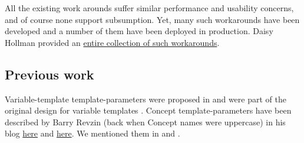 \documentclass{wg21}
\begin{document}
All the existing work arounds suffer similar performance and usability concerns, and of course none support subsumption.
Yet, many such workarounds have been developed and a number of them have been deployed in production.
Daisy Hollman provided an \href{https://p2841.godbolt.org/z/efYK1crb3}{entire collection of such workarounds}.

\pagebreak

%
%
%
%
%
%

\subsection{Previous work}

Variable-template template-parameters were proposed in  and were part of the original design for variable templates .
Concept template-parameters have been described by Barry Revzin (back when Concept names were uppercase) in his blog \href{https://brevzin.github.io/c++/2019/01/09/concept-templates/}{here} and \href{https://brevzin.github.io/c++/2019/03/24/concept-templates-2/}{here}.
We mentioned them in  and .
\end{document}
